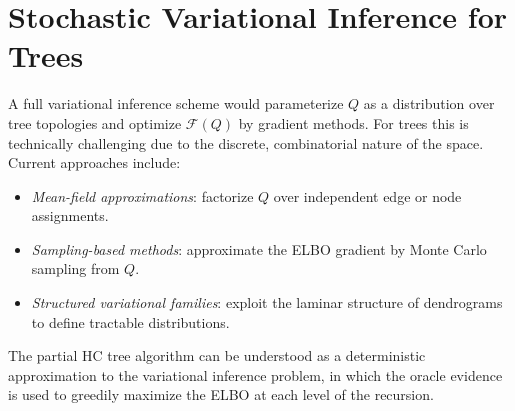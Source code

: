 \section{Stochastic Variational Inference for Trees}

A full variational inference scheme would parameterize $Q$ as a distribution over tree topologies and optimize $\mathcal{F}(Q)$ by gradient methods. For trees this is technically challenging due to the discrete, combinatorial nature of the space. Current approaches include:
\begin{itemize}
  \item \emph{Mean-field approximations}: factorize $Q$ over independent edge or node assignments.
  \item \emph{Sampling-based methods}: approximate the ELBO gradient by Monte Carlo sampling from $Q$.
  \item \emph{Structured variational families}: exploit the laminar structure of dendrograms to define tractable distributions.
\end{itemize}

The partial HC tree algorithm can be understood as a deterministic approximation to the variational inference problem, in which the oracle evidence is used to greedily maximize the ELBO at each level of the recursion.
